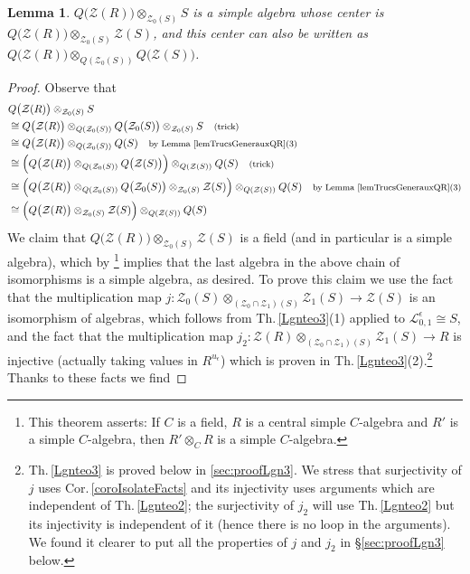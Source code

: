 \documentclass[11pt]{amsart}
\newtheorem{lem}[teo]{Lemma}
\newcommand{\e}{\epsilon}
\begin{document}
\begin{lem}\label{lemmaQZsimple}
$Q\bigl( \mathcal{Z}(R) \bigr) \otimes_{\mathcal{Z}_0(S)} S$ is a simple algebra whose center is $Q\bigl( \mathcal{Z}(R) \bigr) \otimes_{\mathcal{Z}_0(S)} \mathcal{Z}(S)$, and this center can also be written as $Q\bigl( \mathcal{Z}(R) \bigr) \otimes_{Q(\mathcal{Z}_0(S))} Q\bigl( \mathcal{Z}(S) \bigr)$.
\end{lem}
\begin{proof}
Observe that
\begin{align}
&Q\bigl( \mathcal{Z}(R) \bigr) \otimes_{\mathcal{Z}_0(S)} S \nonumber\\
&\cong Q\bigl( \mathcal{Z}(R) \bigr) \otimes_{Q(\mathcal{Z}_0(S))} Q\bigl( \mathcal{Z}_0(S) \bigr) \otimes_{\mathcal{Z}_0(S)} S \quad \text{\footnotesize (trick)} \nonumber\\
&\cong Q\bigl( \mathcal{Z}(R) \bigr) \otimes_{Q(\mathcal{Z}_0(S))} Q(S) \quad \text{\footnotesize by Lemma \ref{lemTrucsGenerauxQR}(3)} \label{chaineIsoQTilde}\\
&\cong \Bigl( Q\bigl( \mathcal{Z}(R) \bigr) \otimes_{Q(\mathcal{Z}_0(S))} Q\bigl(\mathcal{Z}(S) \bigr) \Bigr) \otimes_{Q(\mathcal{Z}(S))} Q(S) \quad \text{\footnotesize (trick)} \nonumber\\
&\cong \Bigl( Q\bigl( \mathcal{Z}(R) \bigr) \otimes_{Q(\mathcal{Z}_0(S))} Q\bigl(\mathcal{Z}_0(S) \bigr) \otimes_{\mathcal{Z}_0(S)} \mathcal{Z}(S) \Bigr) \otimes_{Q(\mathcal{Z}(S))} Q(S) \quad \text{\footnotesize by Lemma \ref{lemTrucsGenerauxQR}(3)} \nonumber\\
&\cong \Bigl( Q\bigl( \mathcal{Z}(R) \bigr) \otimes_{\mathcal{Z}_0(S)} \mathcal{Z}(S) \Bigr) \otimes_{Q(\mathcal{Z}(S))} Q(S) \nonumber
\end{align}
We claim that $Q\bigl( \mathcal{Z}(R) \bigr) \otimes_{\mathcal{Z}_0(S)} \mathcal{Z}(S)$ is a field (and in particular is a simple algebra), which by \cite[Th.\,1.7.27]{Rowen}\footnote{This theorem asserts: If $C$ is a field, $R$ is a central simple $C$-algebra and $R'$ is a simple $C$-algebra, then $R' \otimes_C R$ is a simple $C$-algebra.} implies that the last algebra in the above chain of isomorphisms is a simple algebra, as desired. To prove this claim we use the fact that the multiplication map $j : \mathcal{Z}_0(S) \otimes_{(\mathcal{Z}_0\cap \mathcal{Z}_1)(S)} \mathcal{Z}_1(S) \to \mathcal{Z}(S)$ is an isomorphism of algebras, which follows from Th.\,\ref{Lgnteo3}(1) applied to $\mathcal{L}_{0,1}^\e \cong S$, and the fact that the multiplication map $j_2 : \mathcal{Z}(R) \otimes_{(\mathcal{Z}_0\cap \mathcal{Z}_1)(S)} \mathcal{Z}_1(S) \to R$ is injective (actually taking values in $R^{u_\e}$) which is proven in Th.\,\ref{Lgnteo3}(2).\footnote{Th.\,\ref{Lgnteo3} is proved below in \textsection \ref{sec:proofLgn3}. We stress that surjectivity of $j$ uses Cor.\,\ref{coroIsolateFacts} and its injectivity uses arguments which are independent of Th.\,\ref{Lgnteo2}; the surjectivity of $j_2$ will use Th.\,\ref{Lgnteo2} but its injectivity is independent of it (hence there is no loop in the arguments). We found it clearer to put all the properties of $j$ and $j_2$ in \S\ref{sec:proofLgn3} below.} Thanks to these facts we find

\end{proof}
\end{document}
